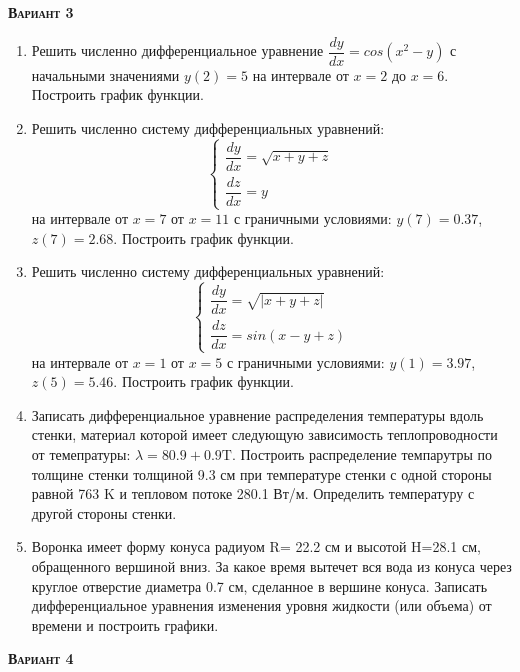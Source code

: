 \textsc{\textbf{Вариант 3}}
\begin{enumerate}
\item Решить численно дифференциальное уравнение $\dfrac{dy}{dx}=cos(x^2-y)             $ с начальными значениями $y(     2)=     5$ на интервале от $x=     2$ до $x=     6$. Построить график функции.\item Решить численно систему дифференциальных уравнений:
 \begin{equation*}
\left\{
\begin{gathered}
\dfrac{dy}{dx}=\sqrt{x+y+z}          \\
\dfrac{dz}{dx}=y                     
\end{gathered}
\right.
\end{equation*}
на интервале от $x= 7$ от $x=11$ с граничными условиями: $y( 7)=0.37$, $z( 7)=2.68$. Построить график функции. 
\item Решить численно систему дифференциальных уравнений:
 \begin{equation*}
\left\{
\begin{gathered}
\dfrac{dy}{dx}=\sqrt{|x+y+z|}\\
\dfrac{dz}{dx}=sin(x-y+z)
\end{gathered}
\right.
\end{equation*}
на интервале от $x= 1$ от $x= 5$ с граничными условиями: $y( 1)=3.97$, $z( 5)=5.46$.  Построить график функции. 
\item  Записать дифференциальное уравнение распределения температуры вдоль стенки, материал которой имеет следующую зависимость теплопроводности от темепратуры: $\lambda=80.9+0.9\text{T}$. Построить распределение темпарутры по толщине стенки толщиной 9.3 см при температуре стенки с одной стороны равной  763 K и тепловом потоке 280.1 Вт/м. Определить температуру с другой стороны стенки.

 \item  Воронка имеет форму конуса радиуом R= 22.2 см и высотой H=28.1 см, обращенного вершиной вниз. За какое время вытечет вся вода из конуса через круглое отверстие диаметра 0.7 см, сделанное в вершине конуса. Записать дифференциальное уравнения изменения уровня жидкости (или объема) от времени и построить графики.

\end{enumerate}
\textsc{\textbf{Вариант 4}}
